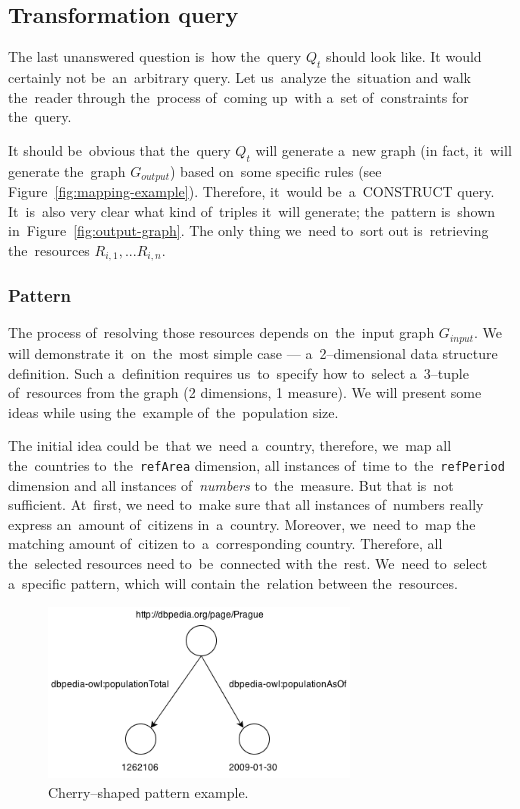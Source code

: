 \subsection{Transformation query}

The last unanswered question is~how the~query $Q_t$ should look like. 
It would certainly not be~an~arbitrary query. Let us~analyze the~situation and 
walk the~reader through the~process of~coming up~with a~set of~constraints for the~query.

It should be~obvious that the~query $Q_t$ will generate a~new graph
(in fact, it~will generate the~graph $G_{output}$) based on~some specific rules
(see Figure~\ref{fig:mapping-example}). 
Therefore, it~would be~a~CONSTRUCT query. It~is~also very clear what kind of~triples it~will generate; the~pattern is~shown in~Figure~\ref{fig:output-graph}.
The only thing we~need to~sort out is~retrieving the~resources $R_{i,1}, ... R_{i,n}$.

\subsubsection{Pattern}
\label{sec:pattern-definition}
The process of~resolving those resources depends on~the~input graph $G_{input}$.
We will demonstrate it~on~the~most simple case --- a~2--dimensional data structure 
definition. Such a~definition requires us~to~specify how to~select a~3--tuple of~resources from 
the graph (2 dimensions, 1 measure).
We will present some ideas while using the~example of~the~population size.

The initial idea could be~that we~need a~country, therefore, we~map all the~countries to~the~\texttt{refArea} dimension, all instances of~time to~the~\texttt{refPeriod} 
dimension and all instances of~\emph{numbers} to~the~measure. But that is~not sufficient. At~first,
we need to~make sure that all instances of~numbers 
really express an~amount of~citizens in~a~country. Moreover, we~need to~map the
matching amount of~citizen to~a~corresponding country. Therefore, all the~selected resources need to~be~connected with the~rest. We~need to~select a~specific pattern, which will contain the~relation between the~resources.

\begin{figure}
	\centering
	\includegraphics[width=80mm]{images/cherry.png}
	\caption{Cherry--shaped pattern example.}
	\label{fig:cherry}
\end{figure}

